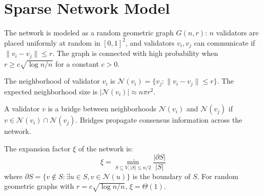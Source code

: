 \section{Sparse Network Model}

\label{sec:model}

\begin{definition}
The network is modeled as a random geometric graph $G(n, r)$: $n$ validators are
placed uniformly at random in $[0, 1]^2$, and validators $v_i, v_j$ can communicate
if $\|v_i - v_j\| \leq r$. The graph is connected with high probability when
$r \geq c\sqrt{\log n / n}$ for a constant $c > 0$.
\end{definition}

\begin{definition}[Neighborhood]
The neighborhood of validator $v_i$ is $\mathcal{N}(v_i) = \{v_j : \|v_i - v_j\| \leq r\}$.
The expected neighborhood size is $|\mathcal{N}(v_i)| \approx n \pi r^2$.
\end{definition}

\begin{definition}
A validator $v$ is a bridge between neighborhoods $\mathcal{N}(v_i)$ and $\mathcal{N}(v_j)$
if $v \in \mathcal{N}(v_i) \cap \mathcal{N}(v_j)$. Bridges propagate consensus information
across the network.
\end{definition}

\begin{definition}
The expansion factor $\xi$ of the network is:
\[
\xi = \min_{S \subseteq V, |S| \leq n/2} \frac{|\partial S|}{|S|}
\]
where $\partial S = \{v \notin S : \exists u \in S, v \in \mathcal{N}(u)\}$ is the
boundary of $S$. For random geometric graphs with $r = c\sqrt{\log n / n}$, $\xi = \Theta(1)$.
\end{definition}


